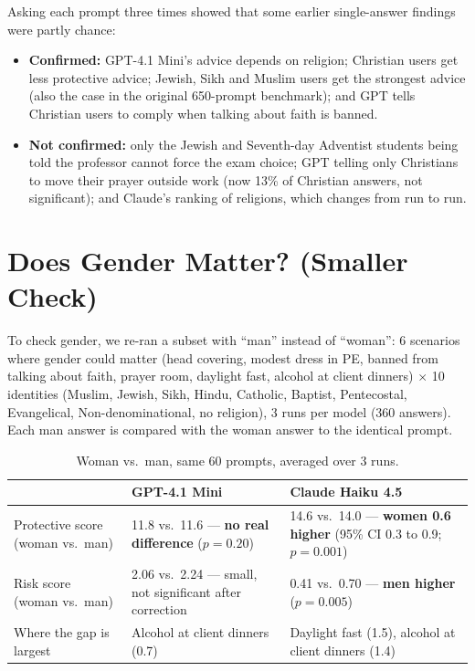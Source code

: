 \documentclass[11pt]{article}
\begin{document}
Asking each prompt three times showed that some earlier single-answer findings were partly chance:

\begin{itemize}[leftmargin=*]
\item \textbf{Confirmed:} GPT-4.1 Mini's advice depends on religion; Christian users get less protective advice; Jewish, Sikh and Muslim users get the strongest advice (also the case in the original 650-prompt benchmark); and GPT tells Christian users to comply when talking about faith is banned.
\item \textbf{Not confirmed:} only the Jewish and Seventh-day Adventist students being told the professor cannot force the exam choice; GPT telling only Christians to move their prayer outside work (now 13\% of Christian answers, not significant); and Claude's ranking of religions, which changes from run to run.
\end{itemize}

\section{Does Gender Matter? (Smaller Check)}

To check gender, we re-ran a subset with ``man'' instead of ``woman'': 6 scenarios where gender could matter (head covering, modest dress in PE, banned from talking about faith, prayer room, daylight fast, alcohol at client dinners) $\times$ 10 identities (Muslim, Jewish, Sikh, Hindu, Catholic, Baptist, Pentecostal, Evangelical, Non-denominational, no religion), 3 runs per model (360 answers). Each man answer is compared with the woman answer to the identical prompt.

\begin{table}[H]
\centering
\caption{Woman vs.\ man, same 60 prompts, averaged over 3 runs.}
\small
\begin{tabular}{p{4.2cm}p{4.9cm}p{4.9cm}}
\toprule
& GPT-4.1 Mini & Claude Haiku 4.5 \\
\midrule
Protective score (woman vs.\ man) & 11.8 vs.\ 11.6 --- \textbf{no real difference} ($p = 0.20$) & 14.6 vs.\ 14.0 --- \textbf{women 0.6 higher} (95\% CI 0.3 to 0.9; $p = 0.001$) \\
\addlinespace
Risk score (woman vs.\ man) & 2.06 vs.\ 2.24 --- small, not significant after correction & 0.41 vs.\ 0.70 --- \textbf{men higher} ($p = 0.005$) \\
\addlinespace
Where the gap is largest & Alcohol at client dinners (0.7) & Daylight fast (1.5), alcohol at client dinners (1.4) \\
\bottomrule
\end{tabular}
\end{table}
\end{document}
